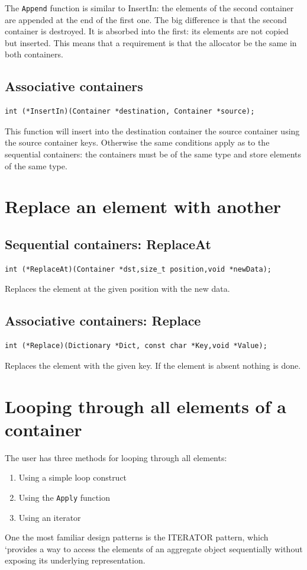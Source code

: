 \documentclass[12pt,a4paper,openany]{memoir} %
\begin{document}
The \texttt{Append} function is similar to InsertIn: the elements of the second container are appended at the end of the first one. The big difference 
is that the second container is destroyed. It is absorbed into the first: its elements are not copied but inserted. This means that a requirement is
that the allocator be the same in both containers.
\subsection{Associative containers}
\begin{verbatim}
int (*InsertIn)(Container *destination, Container *source);
\end{verbatim}
This function will insert into the destination container the source container using the source container keys. Otherwise the same conditions apply as to the sequential containers: the containers must be of the same type and store elements of the same type.
\section{Replace an element with another}
\subsection{Sequential containers: ReplaceAt}
\begin{verbatim}
int (*ReplaceAt)(Container *dst,size_t position,void *newData);
\end{verbatim}
Replaces the element at the given position with the new data. 
\subsection{Associative containers: Replace}
\begin{verbatim}
int (*Replace)(Dictionary *Dict, const char *Key,void *Value);
\end{verbatim}
Replaces the element with the given key. If the element is absent nothing is done.
\section{Looping through all elements of a container}
The user has  three methods for looping through all elements:
\begin{enumerate}
\item Using a simple loop construct
\item Using the \verb,Apply, function
\item Using an iterator
\end{enumerate}
One the most familiar design patterns  is the ITERATOR pattern, which ‘provides a way to access the elements of an aggregate object sequentially without exposing its underlying representation. 
\end{document}
